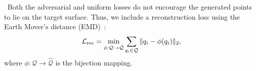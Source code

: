 




 \
Both the adversarial and uniform losses do not encourage the generated points to lie on the target surface.
Thus, we include a reconstruction loss using the Earth Mover's distance (EMD)~\cite{fan2016point}:
%
\vspace*{-1.5mm}
\begin{equation}
	\mathcal{L_{\text{rec}}} = \min_{\phi:\mathcal{Q}\rightarrow \mathcal{\hat{Q}}} \sum_{q_i\in \mathcal{Q}} \|q_i-\phi(q_i)\|_2,
	\vspace*{-1mm}
\end{equation}
%
where %
$\phi:\mathcal{Q}\rightarrow \mathcal{\hat{Q}}$ is the bijection mapping.



